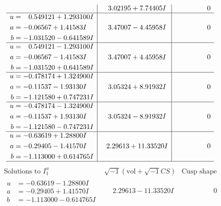 \documentclass[1p]{elsarticle_modified}
\theoremstyle{definition}
\newcommand{\I}{\sqrt{-1}}
\begin{document}
$$\begin{array}{c|c|c}
 & \phantom{-}3.02195 + 7.74405 I & \phantom{-0.000000 } 0 \\ \hline\begin{aligned}
u &= \phantom{-}0.549121 + 1.293100 I \\
a &= -0.06567 + 1.41583 I \\
b &= -1.031520 - 0.641589 I\end{aligned}
 & \phantom{-}3.47007 - 4.45958 I & \phantom{-0.000000 } 0 \\ \hline\begin{aligned}
u &= \phantom{-}0.549121 - 1.293100 I \\
a &= -0.06567 - 1.41583 I \\
b &= -1.031520 + 0.641589 I\end{aligned}
 & \phantom{-}3.47007 + 4.45958 I & \phantom{-0.000000 } 0 \\ \hline\begin{aligned}
u &= -0.478174 + 1.324900 I \\
a &= -0.11537 - 1.93130 I \\
b &= -1.121580 + 0.747231 I\end{aligned}
 & \phantom{-}3.05324 + 8.91932 I & \phantom{-0.000000 } 0 \\ \hline\begin{aligned}
u &= -0.478174 - 1.324900 I \\
a &= -0.11537 + 1.93130 I \\
b &= -1.121580 - 0.747231 I\end{aligned}
 & \phantom{-}3.05324 - 8.91932 I & \phantom{-0.000000 } 0 \\ \hline\begin{aligned}
u &= -0.63619 + 1.28800 I \\
a &= -0.29405 - 1.41570 I \\
b &= -1.113000 + 0.614765 I\end{aligned}
 & \phantom{-}2.29613 + 11.33520 I & \phantom{-0.000000 } 0\\
 \hline 
 \end{array}$$\newpage$$\begin{array}{c|c|c}  
\text{Solutions to }I^u_{1}& \I (\text{vol} + \sqrt{-1}CS) & \text{Cusp shape}\\
 \hline 
\begin{aligned}
u &= -0.63619 - 1.28800 I \\
a &= -0.29405 + 1.41570 I \\
b &= -1.113000 - 0.614765 I\end{aligned}
 & \phantom{-}2.29613 - 11.33520 I & \phantom{-0.000000 } 0 \\ \hline\begin{aligned}

\end{aligned}
\end{array}$$
\end{document}
